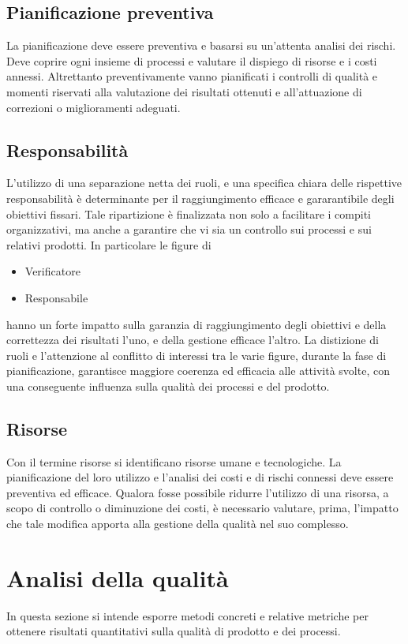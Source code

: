 \documentclass[12pt,a4paper]{article}
\begin{document}
\subsection{Pianificazione preventiva}
La pianificazione deve essere preventiva e basarsi su un'attenta analisi dei rischi. Deve coprire ogni insieme di processi e valutare il dispiego di risorse e i costi annessi. 
Altrettanto preventivamente vanno pianificati i controlli di qualità e momenti riservati alla valutazione dei risultati ottenuti e all'attuazione di correzioni o miglioramenti adeguati.

\subsection{Responsabilità}
L'utilizzo di una separazione netta dei ruoli, e una specifica chiara delle rispettive responsabilità è determinante per il raggiungimento efficace e gararantibile degli obiettivi fissari.
Tale ripartizione è finalizzata non solo a facilitare i compiti organizzativi, ma anche a garantire che vi sia un controllo sui processi e sui relativi prodotti.
In particolare le figure di
\begin{itemize}
	\item Verificatore
	\item Responsabile
\end{itemize}
hanno un forte impatto sulla garanzia di raggiungimento degli obiettivi e della correttezza dei risultati l'uno, e della gestione efficace l'altro.
La distizione di ruoli e l'attenzione al conflitto di interessi tra le varie figure, durante la fase di pianificazione, garantisce maggiore coerenza ed efficacia alle attività svolte, con una conseguente influenza sulla qualità dei  processi e del prodotto.


\subsection{Risorse}\label{risorse}
Con il termine risorse si identificano risorse umane e tecnologiche. La pianificazione del loro utilizzo e l'analisi dei costi e di rischi connessi deve essere preventiva ed efficace.
Qualora fosse possibile ridurre l'utilizzo di una risorsa, a scopo di controllo o diminuzione dei costi, è necessario valutare, prima, l'impatto che tale modifica apporta alla gestione della qualità nel suo complesso.

\newpage

\section{Analisi della qualità}\label{analisi}
In questa sezione si intende esporre metodi concreti e relative metriche per ottenere risultati quantitativi sulla qualità di prodotto e dei processi. 
\end{document}
